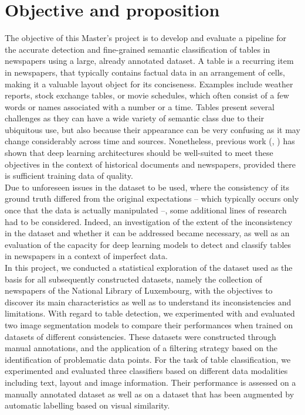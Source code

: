 \section{Objective and proposition}
The objective of this Master's project is to develop and evaluate a pipeline for the accurate detection and fine-grained semantic classification of tables in newspapers using a large, already annotated dataset. A table is a recurring item in newspapers, that typically contains factual data in an arrangement of cells, making it a valuable layout object for its conciseness. Examples include weather reports, stock exchange tables, or movie schedules, which often consist of a few words or names associated with a number or a time. Tables present several challenges as they can have a wide variety of semantic class due to their ubiquitous use, but also because their appearance can be very confusing as it may change considerably across time and sources. Nonetheless, previous work (\citet{ares_oliveira_dhsegment_2018}, \citet{barman_combining_2021}) has shown that deep learning architectures should be well-suited to meet these objectives in the context of historical documents and newspapers, provided there is sufficient training data of quality. \\
Due to unforeseen issues in the dataset to be used, where the consistency of its ground truth differed from the original expectations -- which typically occurs only once that the data is actually manipulated --, some additional lines of research had to be considered. Indeed, an investigation of the extent of the inconsistency in the dataset and whether it can be addressed became necessary, as well as an evaluation of the capacity for deep learning models to detect and classify tables in newspapers in a context of imperfect data.\\

In this project, we conducted a statistical exploration of the dataset used as the basis for all subsequently constructed datasets, namely the collection of newspapers of the National Library of Luxembourg, with the objectives to discover its main characteristics as well as to understand its inconsistencies and limitations. With regard to table detection, we experimented with and evaluated two image segmentation models to compare their performances when trained on datasets of different consistencies. These datasets were constructed through manual annotations, and the application of a filtering strategy based on the identification of problematic data points. For the task of table classification, we experimented and evaluated three classifiers based on different data modalities including text, layout and image information. Their performance is assessed on a manually annotated dataset as well as on a dataset that has been augmented by automatic labelling based on visual similarity.\\

